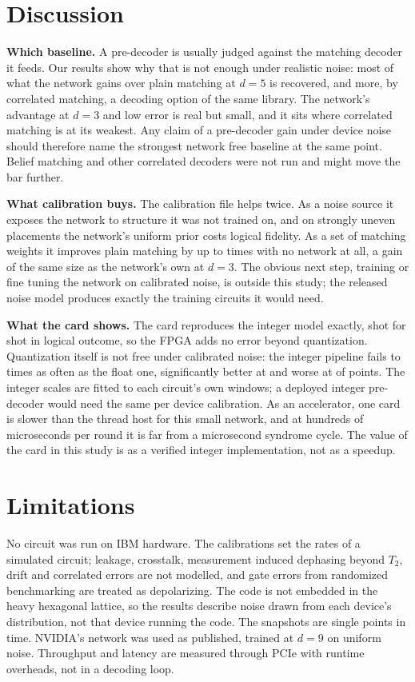 \section{Discussion}\label{sec:discussion}

\textbf{Which baseline.} A pre-decoder is usually judged against the matching decoder it feeds. Our results show why
that is not enough under realistic noise: most of what the network gains over plain matching at $d = 5$ is recovered,
and more, by correlated matching, a decoding option of the same library. The network's advantage at $d = 3$ and low
error is real but small, and it sits where correlated matching is at its weakest. Any claim of a pre-decoder gain
under device noise should therefore name the strongest network free baseline at the same point. Belief matching
\cite{higgott2023belief} and other correlated decoders were not run and might move the bar further.

\textbf{What calibration buys.} The calibration file helps twice. As a noise source it exposes the network to
structure it was not trained on, and on strongly uneven placements the network's uniform prior costs logical
fidelity. As a set of matching weights it improves plain matching by up to \MedWeightsMax{} times with no network at
all, a gain of the same size as the network's own at $d = 3$. The obvious next step, training or fine tuning the
network on calibrated noise, is outside this study; the released noise model produces exactly the training circuits
it would need.

\textbf{What the card shows.} The card reproduces the integer model exactly, shot for shot in logical outcome, so the
FPGA adds no error beyond quantization. Quantization itself is not free under calibrated noise: the integer pipeline
fails \QuantMin{} to \QuantMax{} times as often as the float one, significantly better at \QuantBetter{} and worse at
\QuantWorse{} of \QuantN{} points. The integer scales are fitted to each circuit's own windows; a deployed integer pre-decoder would need the same per
device calibration. As
an accelerator, one card is slower than the \CpuThreads{} thread host for this small network, and at hundreds of
microseconds per round it is far from a microsecond syndrome cycle. The value of the card in this study is as a verified integer
implementation, not as a speedup.

\section{Limitations}\label{sec:limitations}

No circuit was run on IBM hardware. The calibrations set the rates of a simulated circuit; leakage, crosstalk,
measurement induced dephasing beyond $T_2$, drift and correlated errors are not modelled, and gate errors from
randomized benchmarking are treated as depolarizing. The code is not embedded in the heavy hexagonal lattice, so
the results describe noise drawn from each device's distribution, not that device running the code. The snapshots
are single points in time. NVIDIA's network was used as published, trained at $d = 9$ on uniform noise. Throughput
and latency are measured through PCIe with runtime overheads, not in a decoding loop.
